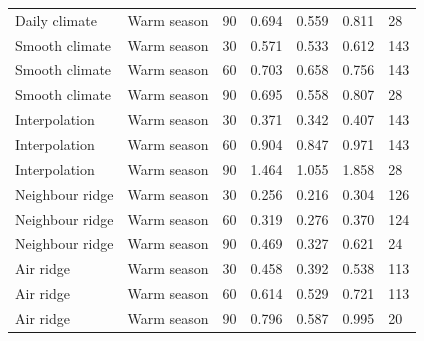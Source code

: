 {\begin{longtable}{p{}p{}p{}p{}p{}p{}p{}}
Daily climate & Warm season & 90 & 0.694 & 0.559 & 0.811 & 28 \\
Smooth climate & Warm season & 30 & 0.571 & 0.533 & 0.612 & 143 \\
Smooth climate & Warm season & 60 & 0.703 & 0.658 & 0.756 & 143 \\
Smooth climate & Warm season & 90 & 0.695 & 0.558 & 0.807 & 28 \\
Interpolation & Warm season & 30 & 0.371 & 0.342 & 0.407 & 143 \\
Interpolation & Warm season & 60 & 0.904 & 0.847 & 0.971 & 143 \\
Interpolation & Warm season & 90 & 1.464 & 1.055 & 1.858 & 28 \\
Neighbour ridge & Warm season & 30 & 0.256 & 0.216 & 0.304 & 126 \\
Neighbour ridge & Warm season & 60 & 0.319 & 0.276 & 0.370 & 124 \\
Neighbour ridge & Warm season & 90 & 0.469 & 0.327 & 0.621 & 24 \\
Air ridge & Warm season & 30 & 0.458 & 0.392 & 0.538 & 113 \\
Air ridge & Warm season & 60 & 0.614 & 0.529 & 0.721 & 113 \\
Air ridge & Warm season & 90 & 0.796 & 0.587 & 0.995 & 20 \\
\bottomrule
\end{longtable}
}

